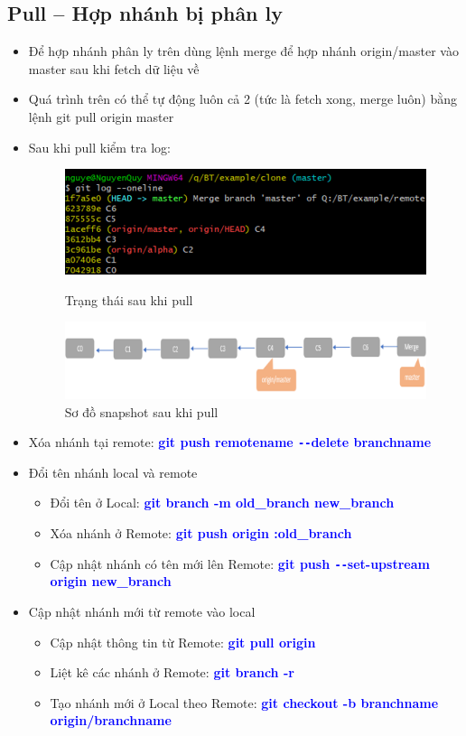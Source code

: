 \documentclass[12pt,a4paper]{report}
\begin{document}
\subsection{Pull – Hợp nhánh bị phân ly}
\begin{itemize}
\item Để hợp nhánh phân ly trên dùng lệnh merge để hợp nhánh origin/master vào master sau khi fetch dữ liệu về
\item Quá trình trên có thể tự động luôn cả 2 (tức là fetch xong, merge luôn) bằng lệnh git pull origin master
\item  Sau khi pull kiểm tra log:
 
\begin{figure}[!ht]
	\centering
 \includegraphics[width=0.8\linewidth]{screenshot076}
 	\label{fig:screenshot076}
\caption{Trạng thái sau khi pull}
\end{figure}

\begin{figure}[!ht]
	\centering
 	\includegraphics[width=0.8\linewidth]{screenshot077}
\caption{Sơ đồ snapshot sau khi pull}
 	\label{fig:screenshot077}
 	\end{figure}

\item Xóa nhánh tại remote: \textcolor{blue}{\bf git push remotename \texttt{-{}-}delete branchname}
 
\item Đổi tên nhánh local và remote
\begin{itemize}
	\item Đổi tên ở Local: \textcolor{blue}{\bf git branch -m old\_branch new\_branch}
  	\item Xóa nhánh ở Remote: \textcolor{blue}{\bf git push origin :old\_branch}
  	\item Cập nhật nhánh có tên mới lên  Remote: \textcolor{blue}{\bf git push \texttt{-{}-}set-upstream origin new\_branch}
\end{itemize}
\item Cập nhật nhánh mới từ remote vào local
 	\begin{itemize}
 	\item Cập nhật thông tin từ Remote: \textcolor{blue}{\bf git pull origin}
	\item Liệt kê các nhánh ở Remote: \textcolor{blue}{\bf git branch -r}
  	\item Tạo nhánh mới ở Local theo Remote: \textcolor{blue}{\bf git checkout -b branchname  origin/branchname}
 \end{itemize}\end{itemize}
\end{document}
